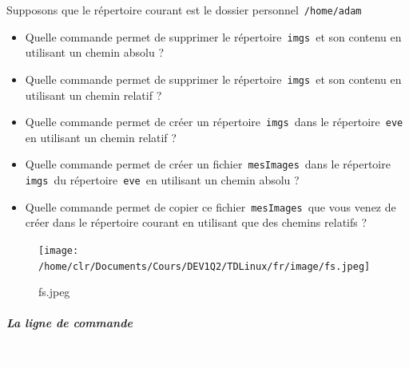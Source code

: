 \documentclass[11pt,a4paper]{article}
\begin{document}
							Supposons que le r\'epertoire courant est le dossier personnel \,\verb|/home/adam|\,
					\begin{itemize}
				
			\item 
										Quelle commande permet de supprimer le r\'epertoire \,\verb|imgs|\, et son contenu en utilisant un chemin absolu ?
										 \textcolor{gray}{\underline{\hspace*{16em}}} 
			\item 
										Quelle commande permet de supprimer le r\'epertoire \,\verb|imgs|\, et son contenu en utilisant un chemin relatif ?
										 \textcolor{gray}{\underline{\hspace*{10em}}} 
			\item 
										Quelle commande permet de cr\'eer un r\'epertoire \,\verb|imgs|\, 
										dans le r\'epertoire \,\verb|eve|\, en utilisant un chemin relatif ?
										 \textcolor{gray}{\underline{\hspace*{16em}}} 
			\item 
										Quelle commande permet de cr\'eer un fichier \,\verb|mesImages|\, 
										dans le r\'epertoire \,\verb|imgs|\, du r\'epertoire \,\verb|eve|\, en utilisant un chemin absolu ?
										 \textcolor{gray}{\underline{\hspace*{16em}}} 
			\item 
										Quelle commande permet de copier ce fichier \,\verb|mesImages|\, 
										que vous venez de cr\'eer dans le r\'epertoire courant en utilisant que des chemins relatifs ?
										 \textcolor{gray}{\underline{\hspace*{16em}}} 
					\end{itemize}
				\begin{figure}[hbt]
				    \begin{center}
					\texttt{[image: /home/clr/Documents/Cours/DEV1Q2/TDLinux/fr/image/fs.jpeg]}
						\end{center}
                
                    \caption[fs.jpeg]{fs.jpeg}
                \end{figure}
                    
            \par
        
			
		\subparagraph{La ligne de commande} 
		
                \textcolor{white}{.} \par
            
\end{document}
